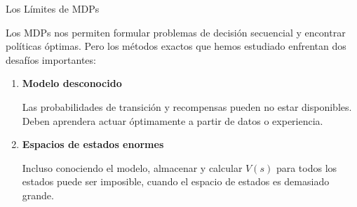 \documentclass[xcolor=dvipsnames]{beamer}
\begin{document}
\begin{frame}{Los Límites de MDPs}

Los MDPs nos permiten formular problemas de decisión secuencial y encontrar políticas óptimas. Pero los métodos exactos que hemos estudiado enfrentan dos desafíos importantes:

\begin{enumerate}
\item<2-> \textbf{Modelo desconocido}

Las probabilidades de transición y recompensas pueden no estar disponibles. Deben aprendera actuar \'optimamente a partir de datos o experiencia.

\item<3-> \textbf{Espacios de estados enormes}

Incluso conociendo el modelo, almacenar y calcular $V(s)$ para todos los estados puede ser imposible, cuando el espacio de estados es demasiado grande.

\end{enumerate}


\end{frame}


%
%
%
\end{document}
